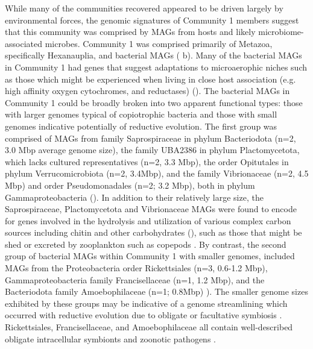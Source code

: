 \documentclass[12pt]{article}
\numberwithin{equation}{section}
\begin{document}
While many of the communities recovered appeared to be driven largely by environmental forces, the genomic signatures of Community 1 members suggest that this community was comprised by MAGs from hosts and likely microbiome-associated microbes. Community 1 was comprised primarily of Metazoa, specifically Hexanauplia, and bacterial MAGs ( b). Many of the bacterial MAGs in Community 1 had genes that suggest adaptations to microaerophic niches such as those which might be experienced when living in close host association (e.g. high affinity oxygen cytochromes, and reductases) (). The bacterial MAGs in Community 1 could be broadly broken into two apparent functional types: those with larger genomes typical of copiotrophic bacteria and those with small genomes indicative potentially of reductive evolution.  The first group was comprised of MAGs from family Saprospiraceae in phylum Bacteriodota (n=2, 3.0 Mbp average genome size), the family UBA2386 in phylum Plactomycetota, which lacks cultured representatives (n=2, 3.3 Mbp), the order Opitutales in phylum Verrucomicrobiota (n=2, 3.4Mbp),  and the family Vibrionaceae (n=2, 4.5 Mbp) and order Pseudomonadales (n=2; 3.2 Mbp), both in phylum Gammaproteobacteria (). In addition to their relatively large size, the Saprospiraceae, Plactomycetota and Vibrionaceae MAGs were found to encode for  genes involved in the hydrolysis and utilization of various complex carbon sources including chitin and other carbohydrates (), such as those that might be shed or excreted by zooplankton such as copepods \citep{De_Corte_2017}.  By contrast, the second group of bacterial MAGs within Community 1 with smaller genomes, included MAGs from the Proteobacteria order Rickettsiales (n=3, 0.6-1.2 Mbp), Gammaproteobacteria family Francisellaceae (n=1, 1.2 Mbp), and the Bacteriodota family Amoebophilaceae (n=1; 0.8Mbp) ).  The smaller genome sizes exhibited by these groups may be indicative of a genome streamlining which occurred with reductive evolution due to obligate or facultative symbiosis \citep{Giovannoni_2014}. Rickettsiales, Francisellaceae, and Amoebophilaceae all contain well-described obligate intracellular symbionts \citep{Santos_Garcia_2014, Darby_2007, Li_2021} and zoonotic pathogens \citep{ Celli_2013, Darby_2007}. 
\end{document}
